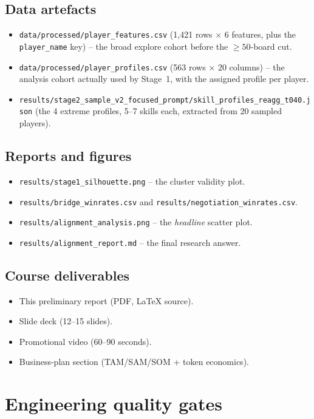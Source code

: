 \documentclass[11pt, a4paper, oneside, openany]{report}
\begin{document}
\subsection*{Data artefacts}
\begin{itemize}[leftmargin=*]
    \item \texttt{data/processed/player\_features.csv} (1{,}421 rows $\times$ 6 features, plus the \texttt{player\_name} key) -- the broad explore cohort before the $\geq 50$-board cut.
    \item \texttt{data/processed/player\_profiles.csv} (563 rows $\times$ 20 columns) -- the analysis cohort actually used by Stage~1, with the assigned profile per player.
    \item \texttt{results/stage2\_sample\_v2\_focused\_prompt/skill\_profiles\_reagg\_t040.json} (the 4 extreme profiles, 5--7 skills each, extracted from 20 sampled players).
\end{itemize}

\subsection*{Reports and figures}
\begin{itemize}[leftmargin=*]
    \item \texttt{results/stage1\_silhouette.png} -- the cluster validity plot.
    \item \texttt{results/bridge\_winrates.csv} and \texttt{results/negotiation\_winrates.csv}.
    \item \texttt{results/alignment\_analysis.png} -- the \emph{headline} scatter plot.
    \item \texttt{results/alignment\_report.md} -- the final research answer.
\end{itemize}

\subsection*{Course deliverables}
\begin{itemize}[leftmargin=*]
    \item This preliminary report (PDF, LaTeX source).
    \item Slide deck (12--15 slides).
    \item Promotional video (60--90 seconds).
    \item Business-plan section (TAM/SAM/SOM + token economics).
\end{itemize}

\section{Engineering quality gates}
\end{document}
